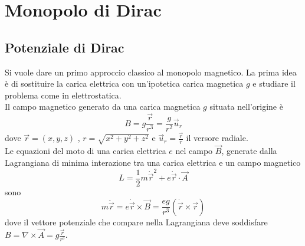 \chapter{Monopolo di Dirac}
\section{Potenziale di Dirac}
Si vuole dare un primo approccio classico al monopolo magnetico.
La prima idea è di sostituire la carica elettrica con un'ipotetica carica magnetica
$g$ e studiare il problema come in elettrostatica.\\
Il campo magnetico generato da una carica magnetica $g$ situata nell'origine è
$$
   B = g \frac{\vec r}{r^3} = \frac{g}{r^2} \vec u _r
$$
dove $\vec r = (x,y,z)$ , $r = \sqrt{x^2 + y^2 + z^2}$ e $\vec u _r = \frac{\vec r}{r}$
il versore radiale.\\
Le equazioni del moto di una carica elettrica $e$ nel campo $\vec B$,
generate dalla Lagrangiana di minima interazione tra una carica elettrica e un campo
magnetico
$$
   L = \frac{1}{2} m \dot{\vec r} ^2 + e \dot{\vec r} \cdot \vec A
$$
sono
$$
   m \ddot{\vec r} = e\dot{\vec r} \times \vec B =
      \frac{eg}{r^3}(\dot{\vec r} \times \vec r)
$$
dove il vettore potenziale che compare nella Lagrangiana deve soddisfare
$B = \nabla \times \vec A = g \frac{\vec r}{r^3}$.\\

